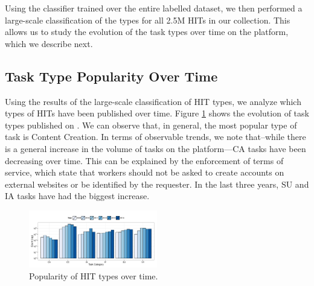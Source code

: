 Using the classifier trained over the entire labelled dataset, we then performed a large-scale classification of the types for all 2.5M HITs in our collection. This allows us to study the evolution of the task types over time on the \amt{} platform, which we describe next.

\subsection{Task Type Popularity Over Time}
Using the results of the large-scale classification of HIT types, we analyze which types of HITs have been published over time.
Figure \ref{fig:cat_trends} shows the evolution of task types published on \amt{}.
% 
We can observe that, in general, the most popular type of task is Content Creation.
% 
In terms of observable trends, we note that--while there is a general increase in the volume of tasks on the platform---CA tasks have been decreasing over time. This can be explained  by the enforcement of \amt{} terms of service, which state that workers should not be asked to create accounts on external websites or be identified by the requester.
% 
In the last three years, SU and IA tasks have had the biggest increase.

\begin{figure}[tb]
	\centering
		\includegraphics[width=0.5\textwidth]{figures/category_trends}
	\caption{Popularity of HIT types over time.}
	\label{fig:cat_trends}
\end{figure}

